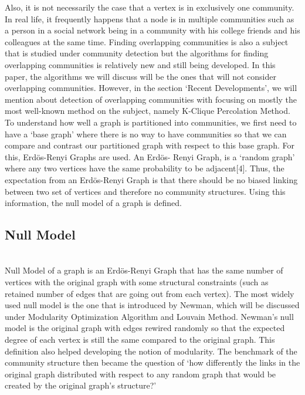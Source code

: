 \documentclass[10pt]{article}
\begin{document}
Also, it is not necessarily the case that a vertex is in exclusively one community. In real life, it frequently happens that a node is in multiple communities such as a person in a social network being in a community with his college friends and his colleagues at the same time. Finding overlapping communities is also a subject that is studied under community detection but the algorithms for finding overlapping communities is relatively new and still being developed. In this paper, the algorithms we will discuss will be the ones that will not consider overlapping communities. However, in the section ‘Recent Developments’, we will mention about detection of overlapping communities with focusing on mostly the most well-known method on the subject, namely K-Clique Percolation Method. \\

To understand how well a graph is partitioned into communities, we first need to have a ‘base graph’ where there is no way to have communities so that we can compare and contrast our partitioned graph with respect to this base graph. For this, Erdös-Renyi Graphs are used. An Erdös- Renyi Graph, is a ‘random graph’ where any two vertices have the same probability to be adjacent[4]. Thus, the expectation from an Erdös-Renyi Graph is that there should be no biased linking between two set of vertices and therefore no community structures. Using this information, the null model of a graph is defined. \\

\subsection{Null Model} \\

Null Model of a graph is an Erdös-Renyi Graph that has the same number of vertices with the original graph with some structural constraints (such as retained number of edges that are going out from each vertex). The most widely used null model is the one that is introduced by Newman, which will be discussed under Modularity Optimization Algorithm and Louvain Method.
Newman’s null model is the original graph with edges rewired randomly so that the expected degree of each vertex is still the same compared to the original graph. This definition also helped developing the notion of modularity. The benchmark of the community structure then became the question of ‘how differently the links in the original graph distributed with respect to any random graph that would be created by the original graph’s structure?’ \\
\end{document}
